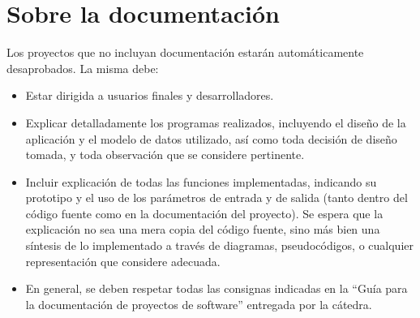 \documentclass[12pt,a4paper]{article}
\begin{document}
\section*{Sobre la documentación}

Los proyectos que no incluyan documentación estarán automáticamente desaprobados. La misma debe:
\begin{itemize}
	
	\item Estar dirigida a usuarios finales y desarrolladores.
	
	\item Explicar detalladamente los programas realizados, incluyendo el diseño de la aplicación y el modelo de datos utilizado, así como toda decisión de diseño tomada, y toda observación que se considere pertinente.
	
	\item Incluir explicación de todas las funciones implementadas, indicando su prototipo y el uso de los parámetros de entrada y de salida (tanto dentro del código fuente como en la documentación del proyecto). Se espera que la explicación no sea una mera copia del código fuente, sino más bien una síntesis de lo implementado a través de diagramas, pseudocódigos, o cualquier representación que considere adecuada.
	
	\item En general, se deben respetar todas las consignas indicadas en la “Guía para la documentación de proyectos de software” entregada por la cátedra.
	
\end{itemize}
\end{document}
